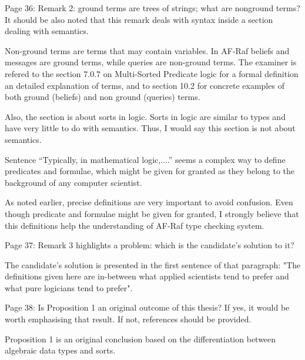\documentclass{article}
\newenvironment{them}{\noindent\begingroup\color{blue}}{\endgroup\par}
\begin{document}
\begin{them}

Page 36:
Remark 2: ground terms are trees of strings; what are nonground terms? It
should be also noted that this remark deals with syntax inside a section
dealing with semantics.

\end{them}
Non-ground terms are terms that may contain variables. In AF-Raf beliefs and
messages are ground terms, while queries are non-ground terms. The examiner is
refered to the section 7.0.7 on Multi-Sorted Predicate logic for a formal
definition an detailed explanation of terms, and to section 10.2 for concrete
examples of both ground (beliefs) and non ground (queries) terms.

Also, the section is about sorts in logic. Sorts in logic are similar to types
and have very little to do with semantics. Thus, I would say this section is
not about semantics.

\begin{them}

Sentence “Typically, in mathematical logic,....” seems a complex way to define
predicates and formulae, which might be given for granted as they belong to the
background of any computer scientist.

\end{them}
As noted earlier, precise definitions are very important to avoid confusion.
Even though predicate and formulae might be given for granted, I strongly
believe that this definitions help the understanding of AF-Raf type checking
system.

\begin{them}

Page 37:
Remark 3 highlights a problem: which is the candidate's solution to it?
\end{them}
The candidate's solution is presented in the first sentence of that paragraph:
"The definitions given here are in-between what applied scientists tend to
prefer and what pure logicians tend to prefer".

\begin{them}

Page 38:
Is Proposition 1 an original outcome of this thesis? If yes, it would be worth
emphasising that result. If not, references should be provided.

\end{them}
Proposition 1 is an original conclusion based on the differentiation between
algebraic data types and sorts. 
\end{document}

